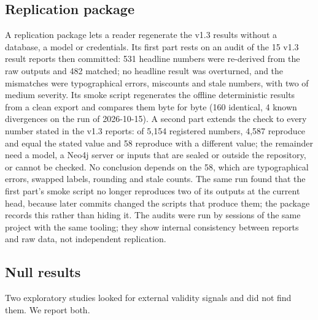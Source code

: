\documentclass[10pt,a4paper]{article}
\begin{document}
\subsection{Replication package}\label{sec:v13-replication}

A replication package lets a reader regenerate the v1.3 results without a database, a model or credentials. Its
first part rests on an audit of the 15 v1.3 result reports then committed: 531 headline numbers were re-derived from
the raw outputs and 482 matched; no headline result was overturned, and the mismatches were typographical errors,
miscounts and stale numbers, with two of medium severity. Its smoke script regenerates the offline deterministic
results from a clean export and compares them byte for byte (160 identical, 4 known divergences on the run of
2026-10-15).
A second part extends the check to every number stated in the v1.3 reports: of 5,154 registered numbers, 4,587
reproduce and equal the stated value and 58 reproduce with a different value; the remainder need a model, a Neo4j
server or inputs that are sealed or outside the repository, or cannot be checked. No conclusion depends on the 58,
which are typographical errors, swapped labels, rounding and stale counts. The same run found that the first
part's smoke script no longer reproduces two of its outputs at the current head, because later commits changed the
scripts that produce them; the package records this rather than hiding it.
The audits were run by sessions of the same project with the same tooling; they show internal consistency between
reports and raw data, not independent replication.

\subsection{Null results}\label{sec:v13-null}

Two exploratory studies looked for external validity signals and did not find them. We report both.
\end{document}
